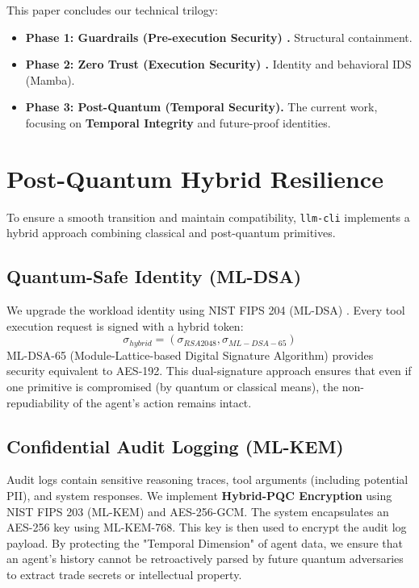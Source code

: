 \documentclass[conference]{IEEEtran}
\begin{document}
This paper concludes our technical trilogy:
\begin{itemize}
    \item \textbf{Phase 1: Guardrails (Pre-execution Security) \cite{ando2026guardrails}.} Structural containment.
    \item \textbf{Phase 2: Zero Trust (Execution Security) \cite{ando2026zerotrust}.} Identity and behavioral IDS (Mamba).
    \item \textbf{Phase 3: Post-Quantum (Temporal Security).} The current work, focusing on \textbf{Temporal Integrity} and future-proof identities.
\end{itemize}

\section{Post-Quantum Hybrid Resilience}
To ensure a smooth transition and maintain compatibility, \texttt{llm-cli} implements a hybrid approach combining classical and post-quantum primitives.

\subsection{Quantum-Safe Identity (ML-DSA)}
We upgrade the workload identity using NIST FIPS 204 (ML-DSA) \cite{nistfips204}. Every tool execution request is signed with a hybrid token:
\begin{equation}
\sigma_{hybrid} = (\sigma_{RSA2048}, \sigma_{ML-DSA-65})
\end{equation}
ML-DSA-65 (Module-Lattice-based Digital Signature Algorithm) provides security equivalent to AES-192. This dual-signature approach ensures that even if one primitive is compromised (by quantum or classical means), the non-repudiability of the agent's action remains intact.

\subsection{Confidential Audit Logging (ML-KEM)}
Audit logs contain sensitive reasoning traces, tool arguments (including potential PII), and system responses. We implement \textbf{Hybrid-PQC Encryption} using NIST FIPS 203 (ML-KEM) \cite{nistfips203} and AES-256-GCM. 
The system encapsulates an AES-256 key using ML-KEM-768. This key is then used to encrypt the audit log payload. By protecting the "Temporal Dimension" of agent data, we ensure that an agent's history cannot be retroactively parsed by future quantum adversaries to extract trade secrets or intellectual property.
\end{document}
